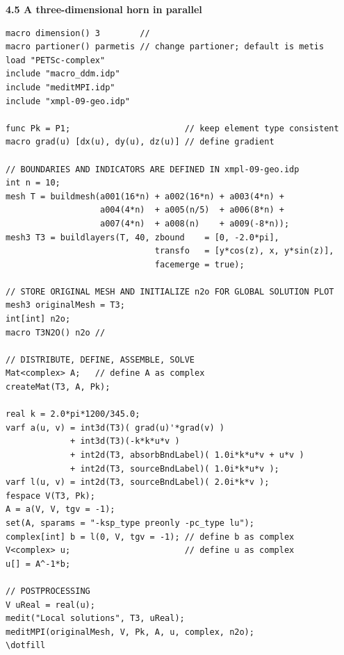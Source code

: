 \documentclass[9pt]{amsart}
\theoremstyle{remark}
\theoremstyle{definition}
\begin{document}
\textbf{4.5 A three-dimensional horn in parallel}
\begin{Verbatim}[commandchars=\\\{\}]     
macro dimension() 3        // 
macro partioner() parmetis // change partioner; default is metis
load "PETSc-complex"
include "macro_ddm.idp"
include "meditMPI.idp"
include "xmpl-09-geo.idp"

func Pk = P1;                       // keep element type consistent  
macro grad(u) [dx(u), dy(u), dz(u)] // define gradient

// BOUNDARIES AND INDICATORS ARE DEFINED IN xmpl-09-geo.idp
int n = 10;
mesh T = buildmesh(a001(16*n) + a002(16*n) + a003(4*n) +
                   a004(4*n)  + a005(n/5)  + a006(8*n) +
                   a007(4*n)  + a008(n)    + a009(-8*n));
mesh3 T3 = buildlayers(T, 40, zbound    = [0, -2.0*pi],
                              transfo   = [y*cos(z), x, y*sin(z)],
                              facemerge = true);
                              
// STORE ORIGINAL MESH AND INITIALIZE n2o FOR GLOBAL SOLUTION PLOT
mesh3 originalMesh = T3;
int[int] n2o;
macro T3N2O() n2o //

// DISTRIBUTE, DEFINE, ASSEMBLE, SOLVE
Mat<complex> A;   // define A as complex
createMat(T3, A, Pk);

real k = 2.0*pi*1200/345.0;
varf a(u, v) = int3d(T3)( grad(u)'*grad(v) )
             + int3d(T3)(-k*k*u*v )
             + int2d(T3, absorbBndLabel)( 1.0i*k*u*v + u*v )
             + int2d(T3, sourceBndLabel)( 1.0i*k*u*v );
varf l(u, v) = int2d(T3, sourceBndLabel)( 2.0i*k*v );
fespace V(T3, Pk);
A = a(V, V, tgv = -1);
set(A, sparams = "-ksp_type preonly -pc_type lu");
complex[int] b = l(0, V, tgv = -1); // define b as complex
V<complex> u;                       // define u as complex
u[] = A^-1*b;

// POSTPROCESSING 
V uReal = real(u);
medit("Local solutions", T3, uReal);
meditMPI(originalMesh, V, Pk, A, u, complex, n2o);
\dotfill


\end{Verbatim}
\end{document}
